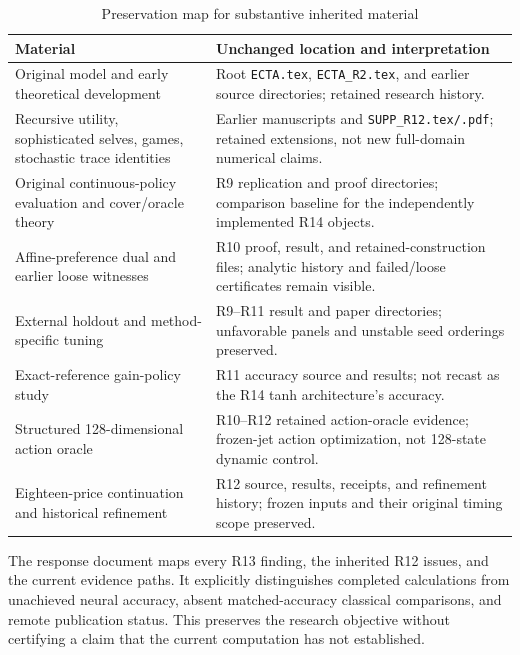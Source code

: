 \begin{table}[ht]\centering\small
\caption{Preservation map for substantive inherited material}
\begin{tabularx}{\linewidth}{p{.35\linewidth}X}
\toprule
Material & Unchanged location and interpretation\\
\midrule
Original model and early theoretical development & Root \texttt{ECTA.tex}, \texttt{ECTA\_R2.tex}, and earlier source directories; retained research history.\\
Recursive utility, sophisticated selves, games, stochastic trace identities & Earlier manuscripts and \texttt{SUPP\_R12.tex/.pdf}; retained extensions, not new full-domain numerical claims.\\
Original continuous-policy evaluation and cover/oracle theory & R9 replication and proof directories; comparison baseline for the independently implemented R14 objects.\\
Affine-preference dual and earlier loose witnesses & R10 proof, result, and retained-construction files; analytic history and failed/loose certificates remain visible.\\
External holdout and method-specific tuning & R9--R11 result and paper directories; unfavorable panels and unstable seed orderings preserved.\\
Exact-reference gain-policy study & R11 accuracy source and results; not recast as the R14 tanh architecture's accuracy.\\
Structured 128-dimensional action oracle & R10--R12 retained action-oracle evidence; frozen-jet action optimization, not 128-state dynamic control.\\
Eighteen-price continuation and historical refinement & R12 source, results, receipts, and refinement history; frozen inputs and their original timing scope preserved.\\
\bottomrule
\end{tabularx}
\end{table}

The response document maps every R13 finding, the inherited R12 issues, and the current evidence paths. It explicitly distinguishes completed calculations from unachieved neural accuracy, absent matched-accuracy classical comparisons, and remote publication status. This preserves the research objective without certifying a claim that the current computation has not established.
